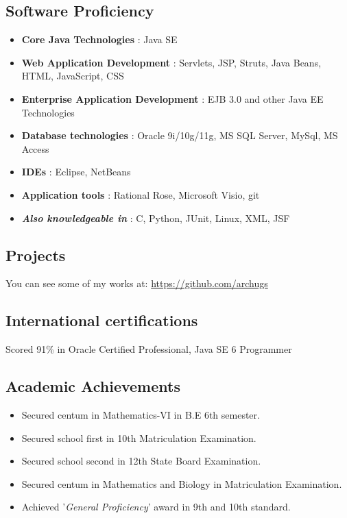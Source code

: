 \documentclass[letterpaper,10pt]{article}
\begin{document}
\subsection*{Software Proficiency}
\begin{itemize}
\item \textbf{Core Java Technologies} : Java SE \linebreak
\item \textbf{Web Application Development} : Servlets, JSP, Struts, Java Beans, HTML, JavaScript, CSS \linebreak
\item \textbf{Enterprise Application Development} : EJB 3.0 and other Java EE Technologies \linebreak
\item \textbf{Database technologies} : Oracle 9i/10g/11g, MS SQL Server, MySql, MS Access \linebreak
\item \textbf{IDEs} : Eclipse, NetBeans \linebreak
\item \textbf{Application tools} : Rational Rose, Microsoft Visio, git \linebreak
\item \textbf{\emph{Also knowledgeable in}} : C, Python, JUnit, Linux, XML, JSF 
\end{itemize}

\subsection*{Projects}
You can see some of my works at: \newline
\url{https://github.com/archugs}

\subsection*{International certifications}
Scored 91\% in Oracle Certified Professional, Java SE 6 Programmer

\subsection*{Academic Achievements}
\begin{itemize}
\item Secured centum in Mathematics-VI in B.E 6th semester.
\item Secured school first in 10th Matriculation Examination.
\item Secured school second in 12th State Board Examination.
\item Secured centum in Mathematics and Biology in Matriculation Examination.
\item Achieved '\emph{General Proficiency}' award in 9th and 10th standard.
\end{itemize}
\end{document}
